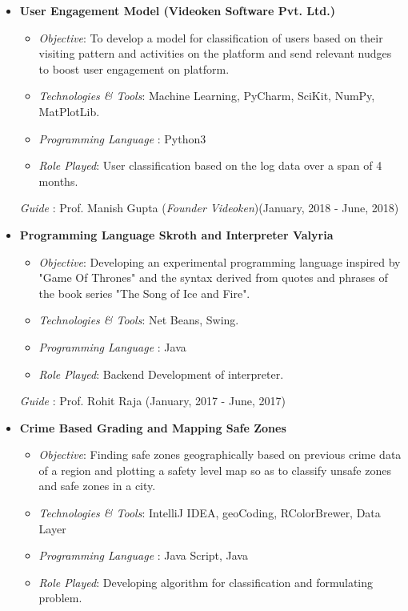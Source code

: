 \documentclass[10pt]{article}
\begin{document}
\begin{description}[style=nextline]
\begin{itemize}
                \item \textbf{User Engagement Model (Videoken Software Pvt. Ltd.)}
                \begin{itemize}
                    \item \emph{Objective}:
                    To develop a model for classification of users based on their visiting pattern and activities on the platform and send relevant nudges to boost user engagement on platform.
                    \item \emph{Technologies \& Tools}: Machine Learning, PyCharm, SciKit, NumPy, MatPlotLib.
                    \item \emph{Programming Language} :  Python3
                    \item \emph{Role Played}: User classification based on the log data over a span of 4 months.   
                \end{itemize}
                                
                {\emph{Guide} : Prof. Manish Gupta (\emph{Founder Videoken})}\hfill(January, 2018 - June, 2018)
                
                \item \textbf{Programming Language Skroth and Interpreter Valyria}
                \begin{itemize}
                    \item \emph{Objective}:
                    Developing an experimental programming language inspired by "Game Of Thrones" and the syntax derived from quotes and phrases of the book series "The Song of Ice and Fire".
                    \item \emph{Technologies \& Tools}: Net Beans, Swing.
                    \item \emph{Programming Language} : Java
                    \item \emph{Role Played}: Backend Development of interpreter.   
                \end{itemize}
                                
                {\emph{Guide} : Prof. Rohit Raja }\hfill(January, 2017 - June, 2017)
                \item \textbf{Crime Based Grading and Mapping Safe Zones}
                \begin{itemize}
                    \item \emph{Objective}:
                    Finding safe zones geographically based on previous crime data of a region and plotting a safety level map so as to classify unsafe zones and safe zones in a city.
                    \item \emph{Technologies \& Tools}: IntelliJ IDEA, geoCoding, RColorBrewer, Data Layer
                    \item \emph{Programming Language} : Java Script, Java
                    \item \emph{Role Played}: Developing algorithm for classification and formulating problem.   
                \end{itemize}
                                

\end{itemize}
\end{description}
\end{document}
